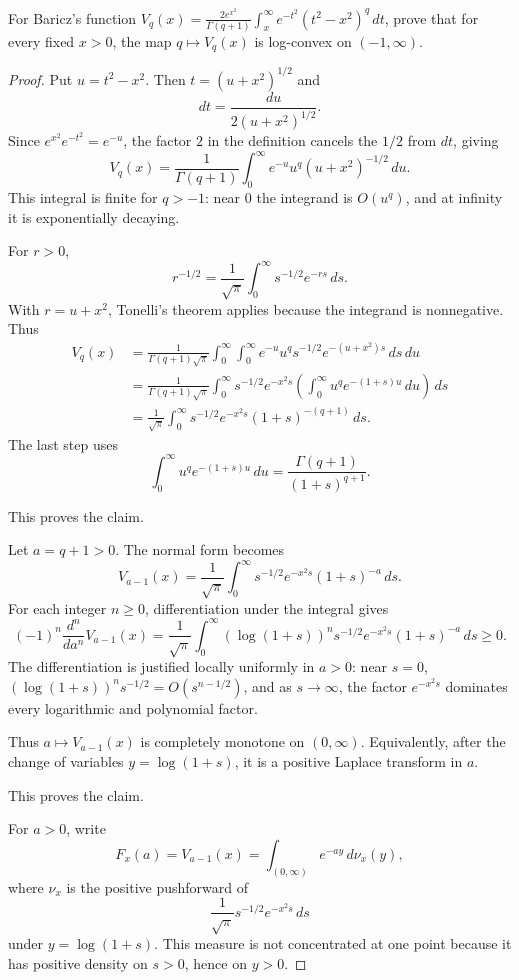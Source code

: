 \begin{lemma}
\label{res:baricz-vq-q-logconvexity-open-problem}
For Baricz's function \(V_q(x)=\frac{2e^{x^2}}{\Gamma(q+1)}\int_x^\infty e^{-t^2}(t^2-x^2)^q\,dt\), prove that for every fixed \(x>0\), the map \(q\mapsto V_q(x)\) is log-convex on \((-1,\infty)\).
\end{lemma}
\begin{proof}
Put \(u=t^2-x^2\). Then \(t=(u+x^2)^{1/2}\) and
\[
dt=\frac{du}{2(u+x^2)^{1/2}}.
\]
Since \(e^{x^2}e^{-t^2}=e^{-u}\), the factor \(2\) in the definition cancels the \(1/2\) from \(dt\), giving
\[
V_q(x)=\frac1{\Gamma(q+1)}
\int_0^\infty e^{-u}u^q(u+x^2)^{-1/2}\,du.
\]
This integral is finite for \(q>-1\): near \(0\) the integrand is \(O(u^q)\), and at infinity it is exponentially decaying.

For \(r>0\),
\[
r^{-1/2}=\frac1{\sqrt\pi}\int_0^\infty s^{-1/2}e^{-rs}\,ds.
\]
With \(r=u+x^2\), Tonelli's theorem applies because the integrand is nonnegative. Thus
\[
\begin{aligned}
V_q(x)
&=\frac1{\Gamma(q+1)\sqrt\pi}
\int_0^\infty\int_0^\infty
e^{-u}u^q s^{-1/2}e^{-(u+x^2)s}\,ds\,du\\
&=\frac1{\Gamma(q+1)\sqrt\pi}
\int_0^\infty s^{-1/2}e^{-x^2s}
\left(\int_0^\infty u^q e^{-(1+s)u}\,du\right)\,ds\\
&=\frac1{\sqrt\pi}\int_0^\infty
s^{-1/2}e^{-x^2s}(1+s)^{-(q+1)}\,ds.
\end{aligned}
\]
The last step uses
\[
\int_0^\infty u^q e^{-(1+s)u}\,du
=\frac{\Gamma(q+1)}{(1+s)^{q+1}}.
\]

This proves the claim.

Let \(a=q+1>0\). The normal form becomes
\[
V_{a-1}(x)=\frac1{\sqrt\pi}\int_0^\infty
s^{-1/2}e^{-x^2s}(1+s)^{-a}\,ds.
\]
For each integer \(n\ge0\), differentiation under the integral gives
\[
(-1)^n\frac{d^n}{da^n}V_{a-1}(x)
=\frac1{\sqrt\pi}\int_0^\infty
(\log(1+s))^n s^{-1/2}e^{-x^2s}(1+s)^{-a}\,ds\ge0.
\]
The differentiation is justified locally uniformly in \(a>0\): near \(s=0\), \((\log(1+s))^n s^{-1/2}=O(s^{n-1/2})\), and as \(s\to\infty\), the factor \(e^{-x^2s}\) dominates every logarithmic and polynomial factor.

Thus \(a\mapsto V_{a-1}(x)\) is completely monotone on \((0,\infty)\). Equivalently, after the change of variables \(y=\log(1+s)\), it is a positive Laplace transform in \(a\).

This proves the claim.

For \(a>0\), write
\[
F_x(a)=V_{a-1}(x)
=\int_{(0,\infty)} e^{-ay}\,d\nu_x(y),
\]
where \(\nu_x\) is the positive pushforward of
\[
\frac1{\sqrt\pi}s^{-1/2}e^{-x^2s}\,ds
\]
under \(y=\log(1+s)\). This measure is not concentrated at one point because it has positive density on \(s>0\), hence on \(y>0\).


\end{proof}
